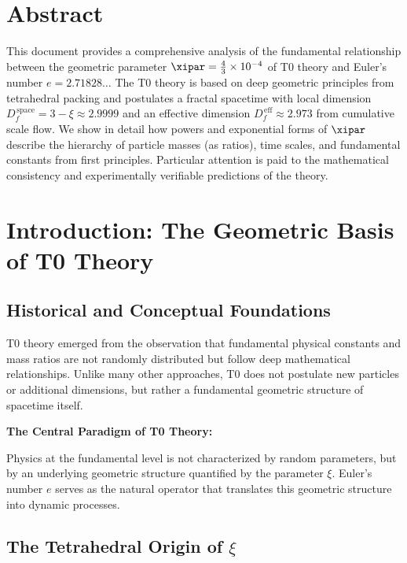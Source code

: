 \section*{Abstract}
		This document provides a comprehensive analysis of the fundamental relationship between the geometric parameter $\xipar = \frac{4}{3} \times 10^{-4}$ of T0 theory and Euler's number $e = 2.71828\ldots$ The T0 theory is based on deep geometric principles from tetrahedral packing and postulates a fractal spacetime with local dimension $D_f^{\,\text{space}} = 3 - \xi \approx 2.9999$ and an effective dimension $D_f^{\,\text{eff}} \approx 2.973$ from cumulative scale flow. We show in detail how powers and exponential forms of $\xipar$ describe the hierarchy of particle masses (as ratios), time scales, and fundamental constants from first principles. Particular attention is paid to the mathematical consistency and experimentally verifiable predictions of the theory.

	
	
	\section{Introduction: The Geometric Basis of T0 Theory}
	
	\subsection{Historical and Conceptual Foundations}
	
	T0 theory emerged from the observation that fundamental physical constants and mass ratios are not randomly distributed but follow deep mathematical relationships. Unlike many other approaches, T0 does not postulate new particles or additional dimensions, but rather a fundamental geometric structure of spacetime itself.
	
	\begin{insight}
		\textbf{The Central Paradigm of T0 Theory:}
		
		Physics at the fundamental level is not characterized by random parameters, but by an underlying geometric structure quantified by the parameter $\xi$. Euler's number $e$ serves as the natural operator that translates this geometric structure into dynamic processes.
	\end{insight}
	
	\subsection{The Tetrahedral Origin of $\xi$}
	
